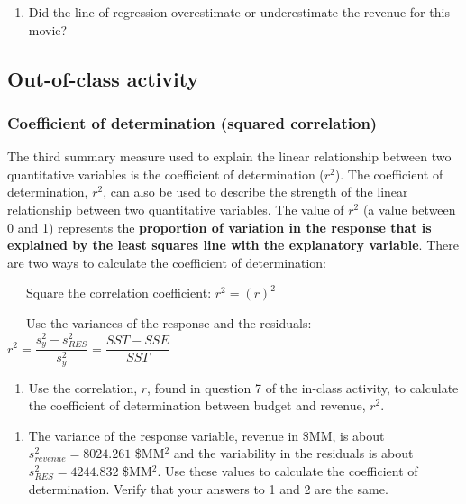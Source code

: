 \documentclass[
]{report}
\providecommand{\tightlist}{%
  \setlength{\itemsep}{0pt}\setlength{\parskip}{0pt}}
\begin{document}
\begin{enumerate}
\def\labelenumi{\arabic{enumi}.}
\setcounter{enumi}{14}
\tightlist
\item
  Did the line of regression overestimate or underestimate the revenue for this movie?
\end{enumerate}

\vspace{.2in}

\hypertarget{out-of-class-activity-4}{%
\subsection{Out-of-class activity}\label{out-of-class-activity-4}}

\hypertarget{coefficient-of-determination-squared-correlation}{%
\subsubsection*{Coefficient of determination (squared correlation)}\label{coefficient-of-determination-squared-correlation}}

The third summary measure used to explain the linear relationship between two quantitative variables is the coefficient of determination (\(r^2\)). The coefficient of determination, \(r^2\), can also be used to describe the strength of the linear relationship between two quantitative variables. The value of \(r^2\) (a value between 0 and 1) represents the \textbf{proportion of variation in the response that is explained by the least squares line with the explanatory variable}. There are two ways to calculate the coefficient of determination:

~~~Square the correlation coefficient: \(r^2 = (r)^2\)

~~~Use the variances of the response and the residuals: \(r^2 = \dfrac{s_y^2 - s_{RES}^2}{s_y^2} = \dfrac{SST - SSE}{SST}\)

\begin{enumerate}
\def\labelenumi{\arabic{enumi}.}
\tightlist
\item
  Use the correlation, \(r\), found in question 7 of the in-class activity, to calculate the coefficient of determination between budget and revenue, \(r^2\).
\end{enumerate}

\vspace{.4in}

\begin{enumerate}
\def\labelenumi{\arabic{enumi}.}
\setcounter{enumi}{1}
\tightlist
\item
  The variance of the response variable, revenue in \$MM, is about \(s_{revenue}^2 = 8024.261\) \$MM\(^2\) and the variability in the residuals is about \(s_{RES}^2 = 4244.832\) \$MM\(^2\). Use these values to calculate the coefficient of determination. Verify that your answers to 1 and 2 are the same.
\end{enumerate}
\end{document}
